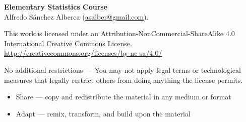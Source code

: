 \sffamily
\small
\noindent \textbf{Elementary Statistics Course}\\
Alfredo Sánchez Alberca (\url{asalber@gmail.com}).
\smallskip

\scriptsize
This work is licensed under an Attribution-NonCommercial-ShareAlike 4.0 International Creative Commons License. 
\url{http://creativecommons.org/licenses/by-nc-sa/4.0/}

\medskip






No additional restrictions — You may not apply legal terms or technological measures that legally restrict others from doing anything the license permits.

\begin{itemize}
\item Share — copy and redistribute the material in any medium or format
\item Adapt — remix, transform, and build upon the material
\end{itemize}

